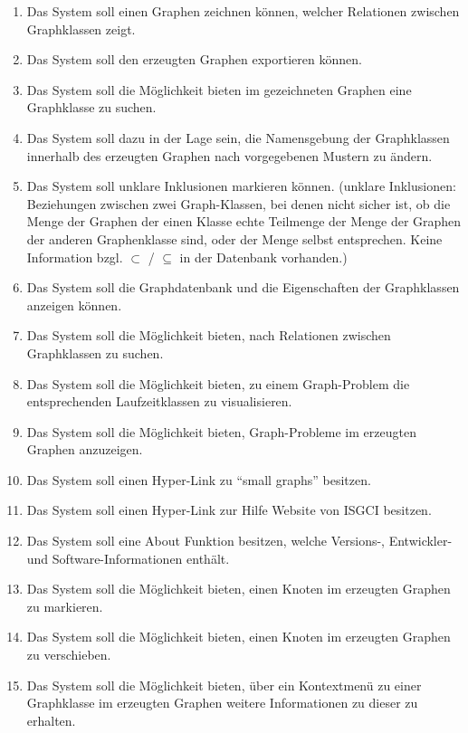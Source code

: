 \documentclass[10pt,a4paper]{article}
\begin{document}
	\begin{enumerate}[leftmargin=.9cm]
\item Das System soll einen Graphen zeichnen können, welcher Relationen zwischen Graphklassen zeigt.
\item Das System soll den erzeugten Graphen exportieren können.
\item Das System soll die Möglichkeit bieten im gezeichneten Graphen eine Graphklasse zu suchen. 
\item Das System soll dazu in der Lage sein, die Namensgebung der Graphklassen innerhalb des erzeugten Graphen nach vorgegebenen Mustern zu ändern.
\item Das System soll unklare Inklusionen markieren können. (unklare Inklusionen: Beziehungen zwischen zwei Graph-Klassen, bei denen nicht sicher ist, ob die Menge der Graphen der einen Klasse echte Teilmenge der Menge der Graphen der anderen Graphenklasse sind, oder der Menge selbst entsprechen. Keine Information bzgl. $\subset$ / $\subseteq$ in der Datenbank vorhanden.)
\item Das System soll die Graphdatenbank und die Eigenschaften der Graphklassen anzeigen können. 
\item Das System soll die Möglichkeit bieten, nach Relationen zwischen Graphklassen zu suchen.
\item Das System soll die Möglichkeit bieten, zu einem Graph-Problem die entsprechenden Laufzeitklassen zu visualisieren.
\item Das System soll die Möglichkeit bieten, Graph-Probleme im erzeugten Graphen anzuzeigen.
\item Das System soll einen Hyper-Link zu "`small graphs"' besitzen.
\item Das System soll einen Hyper-Link zur Hilfe Website von ISGCI besitzen.
\item Das System soll eine About Funktion besitzen, welche Versions-, Entwickler- und Software-Informationen enthält.
\item Das System soll die Möglichkeit bieten, einen Knoten im erzeugten Graphen zu markieren.
\item Das System soll die Möglichkeit bieten, einen Knoten im erzeugten Graphen zu verschieben.
\item Das System soll die Möglichkeit bieten, über ein Kontextmenü zu einer Graphklasse im erzeugten Graphen weitere Informationen zu dieser zu erhalten.

\end{enumerate}
\end{document}
